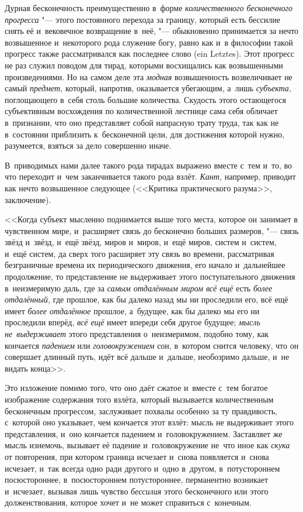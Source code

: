 
Дурная бесконечность преимущественно в~форме
{\em количественного бесконечного прогресса} "--- этого постоянного перехода за
границу, который есть бессилие снять её и~вековечное возвращение в~неё,
"--- обыкновенно принимается за нечто возвышенное и~некоторого рода служение
богу, равно как и~в философии такой прогресс также рассматривался как последнее
слово (ein Letz\-tes). Этот прогресс не раз служил поводом для тирад, которыми
восхищались как возвышенными произведениями. Но на самом деле эта {\em модная}
возвышенность возвеличивает не самый {\em предмет,} который, напротив,
оказывается убегающим, а~лишь {\em субъекта,} поглощающего в~себя столь большие
количества. Скудость этого остающегося субъективным восхождения по
количественной лестнице сама себя обличает в~признании, что оно представляет
собой напрасную трату труда, так как не в~состоянии приблизить к~бесконечной
цели, для достижения которой нужно, разумеется, взяться за дело совершенно
иначе.

В~приводимых нами далее такого рода тирадах выражено вместе с~тем и~то, во что
переходит и~чем заканчивается такого рода взлёт. {\em Кант,} например, приводит
как нечто возвышенное следующее (<<Критика практического разума>>, заключение).

<<Когда субъект мысленно поднимается выше того места, которое он занимает в
чувственном мире, и~расширяет связь до бесконечно больших размеров, "--- связь
звёзд и~звёзд, и~ещё звёзд, миров и~миров, и~ещё миров, систем и~систем, и~ещё
систем, да сверх того расширяет эту связь во времени, рассматривая безграничные
времена их периодического движения, его начало и~дальнейшее продолжение, то
представление не выдерживает этого поступательного движения в~неизмеримую даль,
где за {\em самым отдалённым миром всё ещё} есть {\em более отдалённый,} где
прошлое, как бы далеко назад мы ни проследили его, всё ещё имеет
{\em более отдалённое} прошлое, а~будущее, как бы далеко мы его ни проследили
вперёд, {\em всё ещё} имеет впереди себя другое будущее;
{\em мысль не~выдерживает} этого представления о~неизмеримом, подобно тому, как
кончается {\em падением} или {\em головокружением} сон, в~котором снится
человеку, что он совершает длинный путь, идёт всё дальше и~дальше, необозримо
дальше, и~не видать конца>>.

Это изложение помимо того, что оно даёт сжатое и~вместе с~тем богатое
изображение содержания того взлёта, который вызывается количественным
бесконечным прогрессом, заслуживает похвалы особенно за ту правдивость,
с~которой оно указывает, чем кончается этот взлёт: мысль не выдерживает этого
представления, и~оно кончается падением и~головокружением. Заставляет же мысль
изнемочь, вызывает её падение и~головокружение не~что иное как {\em скука} от
повторения, при котором граница исчезает и~снова появляется и~снова исчезает,
и~так всегда одно ради другого и~одно в~другом, в~потустороннем посюстороннее,
в~посюстороннем потустороннее, перманентно возникает и~исчезает, вызывая лишь
чувство {\em бессилия} этого бесконечного или этого долженствования, которое
хочет и~не может справиться с~конечным.

